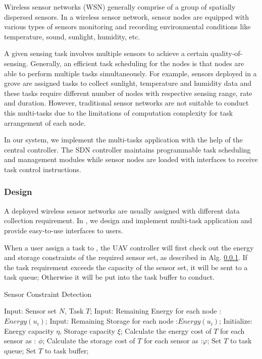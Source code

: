 Wireless sensor networks (WSN)  generally comprise of a group of 
spatially dispersed sensors. In a wireless sensor network, 
sensor nodes are equipped with various 
types of sensors monitoring and recording 
environmental conditions like temperature, sound, sunlight,
humidity, etc.

A given sensing task involves multiple sensors to 
achieve a certain quality-of-sensing.
Generally, an efficient task scheduling for the nodes is that nodes 
are able to perform multiple tasks simultaneously. 
For example, sensors deployed in a grove are assigned tasks to collect
sunlight, temperature and humidity data and these tasks require different 
number of  nodes with respective sensing range, rate and duration.
However, traditional sensor networks are not suitable to conduct this 
multi-tasks due to the limitations of computation complexity for task 
arrangement of each node.

In our {\sdn} system, we implement the multi-tasks application 
with the help of the central controller. The SDN controller
maintains programmable task scheduling and management
modules while sensor nodes are loaded with interfaces to
receive task control instructions.     

\subsubsection{Design}

A deployed wireless sensor networks are usually assigned  with
different data collection requirement. In {\sdn}, we design and 
implement multi-task application and provide easy-to-use
interfaces to users.

When a user assign a task to {\sdn}, the UAV controller will first check out 
the energy and storage constraints of the required sensor set, as described in Alg. \ref{}. 
If the task requirement exceeds the capacity of the sensor set, it will be sent to a     
task queue; Otherwise it will be put into the task buffer to conduct.


\begin{algorithm}
\caption{Sensor Constraint Detection}
\label{Constraint}
\begin{algorithmic}[1]
\STATE Input: Sensor set $N$, Task $T$;
\STATE Input: Remaining Energy for each node :$Energy(u_i)$;
\STATE Input: Remaining Storage for each node :$Energy(u_i)$;
\STATE Initialize: Energy capacity $\eta$, Storage capacity $\xi$;
\STATE Calculate the energy cost of $T$ for each sensor as : $\phi$;
\STATE Calculate the storage cost of $T$ for each sensor as :$\varphi$;
   	 \STATE Set $T$ to task queue;
   	 \ENDIF
\ENDFOR
\STATE Set $T$ to task buffer;
\end{algorithmic}
\end{algorithm}


